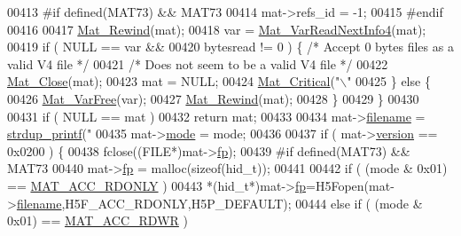 \begin{DoxyCode}
{{{{{{{{{{{{{{{{00413 \textcolor{preprocessor}{#if defined(MAT73) && MAT73}
00414         mat->refs\_id       = -1;
00415 \textcolor{preprocessor}{#endif}
00416 
00417         \hyperlink{group___m_a_t_ga4d6e3892d2e216c507a744ba0e070d0b}{Mat\_Rewind}(mat);
00418         var = \hyperlink{mat4_8c_a494a64be8f002874f2048687561f65d3}{Mat\_VarReadNextInfo4}(mat);
00419         \textcolor{keywordflow}{if} ( NULL == var &&
00420              bytesread != 0 ) \{ \textcolor{comment}{/* Accept 0 bytes files as a valid V4 file */}
00421             \textcolor{comment}{/* Does not seem to be a valid V4 file */}
00422             \hyperlink{group___m_a_t_ga101c92ff7bde4a2d4615661beba09262}{Mat\_Close}(mat);
00423             mat = NULL;
00424             \hyperlink{group__mat__util_gaf51f2bfbb5580f575e4dd79757e2b80c}{Mat\_Critical}(\textcolor{stringliteral}{"\(\backslash\)"%
00425         \} \textcolor{keywordflow}{else} \{
00426             \hyperlink{group___m_a_t_ga1d14716f7450530fd1c9d02413787f0e}{Mat\_VarFree}(var);
00427             \hyperlink{group___m_a_t_ga4d6e3892d2e216c507a744ba0e070d0b}{Mat\_Rewind}(mat);
00428         \}
00429     \}
00430 
00431     \textcolor{keywordflow}{if} ( NULL == mat )
00432         \textcolor{keywordflow}{return} mat;
00433 
00434     mat->\hyperlink{struct__mat__t_a340b191598135edd03b6dec847f0b1b1}{filename} = \hyperlink{group__mat__util_ga291b08f933c75fb70e3736b669896ebd}{strdup\_printf}(\textcolor{stringliteral}{"%
00435     mat->\hyperlink{struct__mat__t_aa43288b63b8edb7cadf0b79e2d1df2ee}{mode} = mode;
00436 
00437     \textcolor{keywordflow}{if} ( mat->\hyperlink{struct__mat__t_a729c2bc0afc97485057a5af425635b1a}{version} == 0x0200 ) \{
00438         fclose((FILE*)mat->\hyperlink{struct__mat__t_a85f562e407ca9ad4d2a6e14f839432b7}{fp});
00439 \textcolor{preprocessor}{#if defined(MAT73) && MAT73}
00440         mat->\hyperlink{struct__mat__t_a85f562e407ca9ad4d2a6e14f839432b7}{fp} = malloc(\textcolor{keyword}{sizeof}(hid\_t));
00441 
00442         \textcolor{keywordflow}{if} ( (mode & 0x01) == \hyperlink{group___m_a_t_ggaa9dcbc70f538af79bd557593ff6b5cdba8dd1457651b27ba9bea6cfba158c037c}{MAT\_ACC\_RDONLY} )
00443             *(hid\_t*)mat->\hyperlink{struct__mat__t_a85f562e407ca9ad4d2a6e14f839432b7}{fp}=H5Fopen(mat->\hyperlink{struct__mat__t_a340b191598135edd03b6dec847f0b1b1}{filename},H5F\_ACC\_RDONLY,H5P\_DEFAULT);
00444         \textcolor{keywordflow}{else} \textcolor{keywordflow}{if} ( (mode & 0x01) == \hyperlink{group___m_a_t_ggaa9dcbc70f538af79bd557593ff6b5cdba0f65f27ea42fde32d62b702b82329c1f}{MAT\_ACC\_RDWR} )
}}}}}}}}}}}}}}}}}}
\end{DoxyCode}
